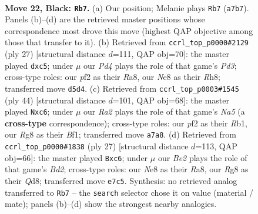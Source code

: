 \documentclass[11pt]{article}
\begin{document}
\clearpage

\begin{figure}[p]\centering
\begin{subfigure}{0.46\textwidth}\centering
\resizebox{\linewidth}{!}{%
\newchessgame
\chessboard[
  setfen={2bqnkr1/r3bp2/p5p1/n1Bpp2p/P3P3/3PQ2N/BPP2PPP/RN2R1K1 b - - 0 22},
  showmover=false,
  pgfstyle=straightmove, color=movearrow, markmove={a7-b7}
]}
\caption{}
\end{subfigure}\hfill
\begin{subfigure}{0.46\textwidth}\centering
\resizebox{\linewidth}{!}{%
\newchessgame
\chessboard[
  setfen={r2qk2r/1ppb2bp/3ppnp1/pBB5/P3P3/2P2P2/1P1Q1NPP/R3K1NR b KQkq - 0 14},
  showmover=false,
  pgfstyle=straightmove, color=movearrow, markmove={d6-c5}
]}
\caption{}
\end{subfigure}
\\[4pt]
\begin{subfigure}{0.46\textwidth}\centering
\resizebox{\linewidth}{!}{%
\newchessgame
\chessboard[
  setfen={rqr1b1k1/5pp1/pbnppn1p/N7/1P2PP2/R1N1B2P/2P3P1/1R2QBK1 w - - 1 23},
  showmover=false,
  pgfstyle=straightmove, color=movearrow, markmove={a5-c6}
]}
\caption{}
\end{subfigure}\hfill
\begin{subfigure}{0.46\textwidth}\centering
\resizebox{\linewidth}{!}{%
\newchessgame
\chessboard[
  setfen={r2qk2r/1p1bbpp1/p1B1pn2/2p5/2P4p/1P3N1P/P2PNPP1/R1BQR1K1 b kq - 0 14},
  showmover=false,
  pgfstyle=straightmove, color=movearrow, markmove={d7-c6}
]}
\caption{}
\end{subfigure}
\caption{\textbf{Move 22, Black: \texttt{Rb7}.} (a) Our position; Melanie plays \texttt{Rb7} (\texttt{a7b7}). Panels (b)--(d) are the retrieved master positions whose correspondence most drove this move (highest QAP objective among those that transfer to it). (b) Retrieved from \texttt{ccrl\_top\_p0000\#2129} (ply 27) [structural distance $d$=111, QAP obj=70]: the master played \texttt{dxc5}; under $\mu$ our \emph{Pd4} plays the role of that game's \emph{Pd3}; cross-type roles: our \emph{p}f2 as their \emph{R}a8, our \emph{N}e8 as their \emph{R}h8; transferred move \texttt{d5d4}. (c) Retrieved from \texttt{ccrl\_top\_p0003\#1545} (ply 44) [structural distance $d$=101, QAP obj=68]: the master played \texttt{Nxc6}; under $\mu$ our \emph{Ra2} plays the role of that game's \emph{Na5} (a \textbf{cross-type} correspondence); cross-type roles: our \emph{p}f2 as their \emph{R}b1, our \emph{R}g8 as their \emph{B}f1; transferred move \texttt{a7a8}. (d) Retrieved from \texttt{ccrl\_top\_p0000\#1838} (ply 27) [structural distance $d$=113, QAP obj=66]: the master played \texttt{Bxc6}; under $\mu$ our \emph{Be2} plays the role of that game's \emph{Bd2}; cross-type roles: our \emph{N}e8 as their \emph{R}a8, our \emph{R}g8 as their \emph{Q}d8; transferred move \texttt{e7c5}. Synthesis: no retrieved analog transferred to \texttt{Rb7} -- the \texttt{search} selector chose it on value (material / mate); panels (b)--(d) show the strongest nearby analogies.}
\label{fig:thought-m43}
\end{figure}
\end{document}
